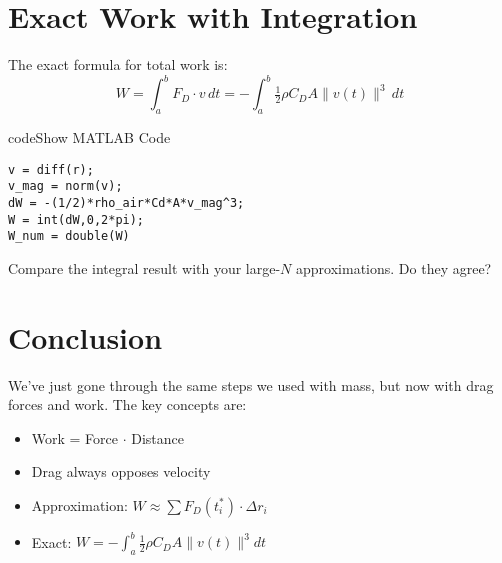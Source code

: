 \documentclass{ximera}
\begin{document}
\section*{Exact Work with Integration}

The exact formula for total work is:
$$
W = \int_a^b F_D \cdot v \, dt = -\int_a^b \tfrac{1}{2}\rho C_D A \|v(t)\|^3 \, dt
$$

\begin{expandable}{code}{Show MATLAB Code}
\begin{verbatim}
v = diff(r);
v_mag = norm(v);
dW = -(1/2)*rho_air*Cd*A*v_mag^3;
W = int(dW,0,2*pi);
W_num = double(W)
\end{verbatim}
\end{expandable}

\begin{problem}
Compare the integral result with your large-$N$ approximations. Do they agree?
\end{problem}

\section*{Conclusion}

We've just gone through the same steps we used with mass, but now with drag forces and work. The key concepts are:
\begin{itemize}
\item Work = Force $\cdot$ Distance
\item Drag always opposes velocity
\item Approximation: $W \approx \sum F_D(t_i^*) \cdot \Delta r_i$
\item Exact: $W = -\int_a^b \tfrac{1}{2}\rho C_D A \|v(t)\|^3 dt$
\end{itemize}
\end{document}
